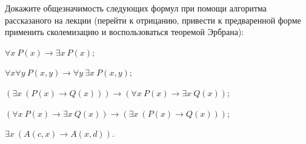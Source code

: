 Докажите общезначимость следующих формул при помощи алгоритма рассказаного на лекции (перейти к
отрицанию, привести к предваренной форме применить сколемизацию и воспользоваться теоремой Эрбрана):
\begin{enumcyr}
    \item $\forall x~P(x) \to \exists x~P(x)$;
    \item $\forall x \forall y~P(x, y) \to \forall y~\exists x~P(x, y)$;
    \item $(\exists x~(P(x) \to Q(x))) \to (\forall x~P(x) \to \exists x~Q(x))$;
    \item $(\forall x~P(x) \to \exists x~Q(x)) \to (\exists x~(P(x) \to Q(x)))$;
    \item $\exists x~(A(c, x) \to A(x, d))$.
\end{enumcyr}
